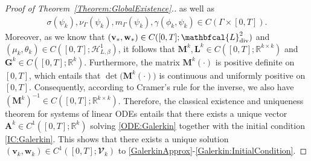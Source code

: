 \documentclass[10pt,reqno]{amsart}
\theoremstyle{remark}
\numberwithin{equation}{section}
\newcommand{\R}{\mathbb R}
\newcommand{\bv}{\mathbf{v}}
\newcommand{\bw}{\mathbf{w}}
\newcommand{\M}{\mathbf{M}}
\newcommand{\Div}{\textnormal{div}}
\newcommand{\Ga}{\Gamma}
\begin{document}
\begin{proof}[Proof of Theorem~\ref{Theorem:GlobalExistence}.]
as well as 
\begin{align*}
    \sigma(\psi_k), \nu_\Ga(\psi_k), m_\Ga(\psi_k), \gamma(\phi_k,\psi_k)\in C(\Ga\times[0,T]).
\end{align*}
Moreover, as we know that $(\bv_\ast,\bw_\ast)\in C([0,T];\mathbfcal{L}^2_\Div)$ and $(\mu_k,\theta_k)\in C([0,T];\mathcal{H}^1_{L,\beta})$, it follows that $\mathbf{M}^k,\mathbf{L}^k\in C([0,T];\R^{k\times k})$ and $\mathbf{G}^k\in C([0,T];\R^k)$. Furthermore, the matrix $\mathbf{M}^k(\cdot)$ is positive definite on $[0,T]$, which entails that $\det\big(\M^k(\cdot)\big)$ is continuous and uniformly positive on $[0,T]$. Consequently, according to Cramer's rule for the inverse, we also have $(\M^k)^{-1}\in C([0,T];\R^{k\times k})$. Therefore, the classical existence and uniqueness theorem for systems of linear ODEs entails that there exists a unique vector $\mathbf{A}^k\in C^1([0,T];\mathbb{R}^k)$ solving \eqref{ODE:Galerkin} together with the initial condition \eqref{IC:Galerkin}. This shows that there exists a unique solution $(\bv_k,\bw_k)\in C^1([0,T];\mathbfcal{V}_k)$ to \eqref{GalerkinApprox}-\eqref{Galerkin:InitialCondition}.


\end{proof}
\end{document}

